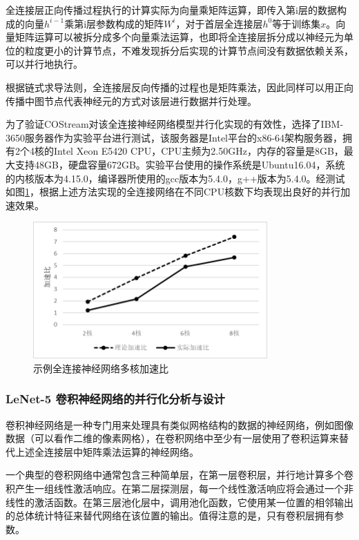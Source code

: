 全连接层正向传播过程执行的计算实际为向量乘矩阵运算，即传入第i层的数据构成的向量$h^{i - 1}$乘第i层参数构成的矩阵$W^{i}$，对于首层全连接层$h^{0}$等于训练集${x}$。向量矩阵运算可以被拆分成多个向量乘法运算，也即将全连接层拆分成以神经元为单位的粒度更小的计算节点，不难发现拆分后实现的计算节点间没有数据依赖关系，可以并行地执行。

根据链式求导法则，全连接层反向传播的过程也是矩阵乘法，因此同样可以用正向传播中图节点代表神经元的方式对该层进行数据并行处理。

为了验证COStream对该全连接神经网络模型并行化实现的有效性，选择了IBM-3650服务器作为实验平台进行测试，该服务器是Intel平台的x86-64架构服务器，拥有2个4核的Intel Xeon E5420 CPU，CPU主频为2.50GHz，内存的容量是8GB，最大支持48GB，硬盘容量672GB。实验平台使用的操作系统是Ubuntu16.04，系统的内核版本为4.15.0，编译器所使用的gcc版本为5.4.0，g++版本为5.4.0。经测试如图\ref{fig:dnn_speedup}，根据上述方法实现的全连接网络在不同CPU核数下均表现出良好的并行加速效果。

\begin{figure}[!t]
\centering
\includegraphics[width=0.8\textwidth]{../img/Chap_Application/Yu/dnn_speedup.png}
\caption{示例全连接神经网络多核加速比}
\label{fig:dnn_speedup}
\end{figure}

\subsubsection{LeNet-5 卷积神经网络的并行化分析与设计}

卷积神经网络是一种专门用来处理具有类似网格结构的数据的神经网络，例如图像数据（可以看作二维的像素网格），在卷积网络中至少有一层使用了卷积运算来替代上述全连接层中矩阵乘法运算的神经网络。

一个典型的卷积网络中通常包含三种简单层，在第一层卷积层，并行地计算多个卷积产生一组线性激活响应。在第二层探测层，每一个线性激活响应将会通过一个非线性的激活函数。在第三层池化层中，调用池化函数，它使用某一位置的相邻输出的总体统计特征来替代网络在该位置的输出。值得注意的是，只有卷积层拥有参数。

